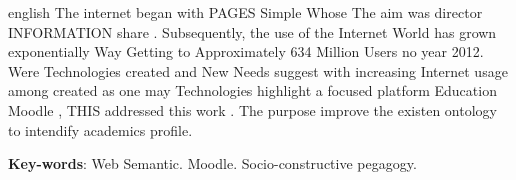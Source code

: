 \begin{resumo}[Abstract]
 \begin{otherlanguage*}{english}
 The internet began with PAGES Simple Whose The aim was director INFORMATION share . Subsequently, the use of the Internet World has grown exponentially Way Getting to Approximately 634 Million Users no year 2012. Were Technologies created and New Needs suggest with increasing Internet usage among created as one may Technologies highlight a focused platform Education Moodle , THIS addressed this work . The purpose improve the existen ontology to intendify academics profile.

   \vspace{\onelineskip}
 
   \noindent 
   \textbf{Key-words}: Web Semantic. Moodle. Socio-constructive pegagogy.
 \end{otherlanguage*}
\end{resumo}
